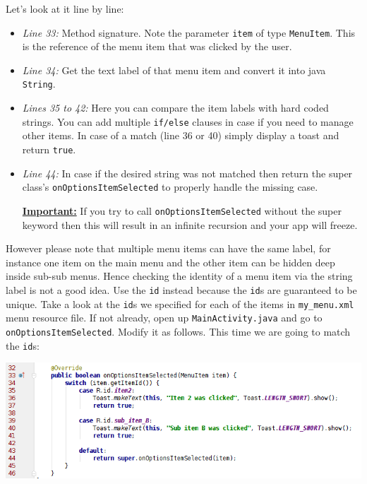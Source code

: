 Let's look at it line by line:

\begin{itemize}
	\item \textit{Line 33:} Method signature. Note the parameter \texttt{item} of type \texttt{MenuItem}. This is the reference of the menu item that was clicked by the user.
	
	\item \textit{Line 34:} Get the text label of that menu item and convert it into java \texttt{String}.
	
	\item \textit{Lines 35 to 42:} Here you can compare the item labels with hard coded strings. You can add multiple \texttt{if/else} clauses in case if you need to manage other items. In case of a match (line 36 or 40) simply display a toast and return \texttt{true}.
	
	\item \textit{Line 44:} In case if the desired string was not matched then return the super class's \texttt{onOptionsItemSelected} to properly handle the missing case. 
	
	\underline{\textbf{Important:}} If you try to call \texttt{onOptionsItemSelected} without the super keyword then this will result in an infinite recursion and your app will freeze. \\
\end{itemize}

However please note that multiple menu items can have the same label, for instance one item on the main menu and the other item can be hidden deep inside sub-sub menus. Hence checking the identity of a menu item via the string label is not a good idea. Use the \texttt{id} instead because the \texttt{id}s are guaranteed to be unique. Take a look at the \texttt{id}s we specified for each of the items in \texttt{my\_menu.xml} menu resource file. If not already, open up \texttt{MainActivity.java} and go to \texttt{onOptionsItemSelected}. Modify it as follows. This time we are going to match the \texttt{id}s:

\begin{center}
	\includegraphics[scale=0.4]{chapters/ch07/images/50}
\end{center}

